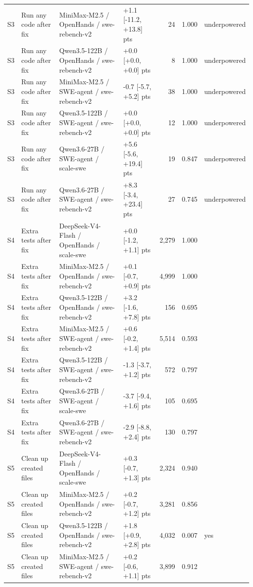 \begin{tabular}{llllrrl}
S3 & Run any code after fix & MiniMax-M2.5 / OpenHands / swe-rebench-v2 & +1.1 [-11.2, +13.8] pts & 24 & 1.000 & underpowered \\
S3 & Run any code after fix & Qwen3.5-122B / OpenHands / swe-rebench-v2 & +0.0 [+0.0, +0.0] pts & 8 & 1.000 & underpowered \\
S3 & Run any code after fix & MiniMax-M2.5 / SWE-agent / swe-rebench-v2 & -0.7 [-5.7, +5.2] pts & 38 & 1.000 & underpowered \\
S3 & Run any code after fix & Qwen3.5-122B / SWE-agent / swe-rebench-v2 & +0.0 [+0.0, +0.0] pts & 12 & 1.000 & underpowered \\
S3 & Run any code after fix & Qwen3.6-27B / SWE-agent / scale-swe & +5.6 [-5.6, +19.4] pts & 19 & 0.847 & underpowered \\
S3 & Run any code after fix & Qwen3.6-27B / SWE-agent / swe-rebench-v2 & +8.3 [-3.4, +23.4] pts & 27 & 0.745 & underpowered \\
S4 & Extra tests after fix & DeepSeek-V4-Flash / OpenHands / scale-swe & +0.0 [-1.2, +1.1] pts & 2,279 & 1.000 &  \\
S4 & Extra tests after fix & MiniMax-M2.5 / OpenHands / swe-rebench-v2 & +0.1 [-0.7, +0.9] pts & 4,999 & 1.000 &  \\
S4 & Extra tests after fix & Qwen3.5-122B / OpenHands / swe-rebench-v2 & +3.2 [-1.6, +7.8] pts & 156 & 0.695 &  \\
S4 & Extra tests after fix & MiniMax-M2.5 / SWE-agent / swe-rebench-v2 & +0.6 [-0.2, +1.4] pts & 5,514 & 0.593 &  \\
S4 & Extra tests after fix & Qwen3.5-122B / SWE-agent / swe-rebench-v2 & -1.3 [-3.7, +1.2] pts & 572 & 0.797 &  \\
S4 & Extra tests after fix & Qwen3.6-27B / SWE-agent / scale-swe & -3.7 [-9.4, +1.6] pts & 105 & 0.695 &  \\
S4 & Extra tests after fix & Qwen3.6-27B / SWE-agent / swe-rebench-v2 & -2.9 [-8.8, +2.4] pts & 130 & 0.797 &  \\
S5 & Clean up created files & DeepSeek-V4-Flash / OpenHands / scale-swe & +0.3 [-0.7, +1.3] pts & 2,324 & 0.940 &  \\
S5 & Clean up created files & MiniMax-M2.5 / OpenHands / swe-rebench-v2 & +0.2 [-0.7, +1.2] pts & 3,281 & 0.856 &  \\
S5 & Clean up created files & Qwen3.5-122B / OpenHands / swe-rebench-v2 & +1.8 [+0.9, +2.8] pts & 4,032 & 0.007 & yes \\
S5 & Clean up created files & MiniMax-M2.5 / SWE-agent / swe-rebench-v2 & +0.2 [-0.6, +1.1] pts & 3,899 & 0.912 &  \\

\end{tabular}
